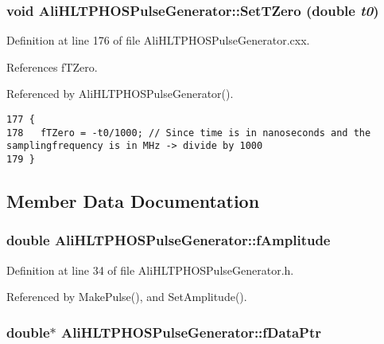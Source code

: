\subsubsection{\setlength{\rightskip}{0pt plus 5cm}void Ali\-HLTPHOSPulse\-Generator::Set\-TZero (double {\em t0})}\label{classAliHLTPHOSPulseGenerator_AliHLTPHOSPulseGeneratora14}




Definition at line 176 of file Ali\-HLTPHOSPulse\-Generator.cxx.

References f\-TZero.

Referenced by Ali\-HLTPHOSPulse\-Generator().

\footnotesize\begin{verbatim}177 {
178   fTZero = -t0/1000; // Since time is in nanoseconds and the samplingfrequency is in MHz -> divide by 1000
179 }
\end{verbatim}\normalsize 




\subsection{Member Data Documentation}
\subsubsection{\setlength{\rightskip}{0pt plus 5cm}double {\bf Ali\-HLTPHOSPulse\-Generator::f\-Amplitude}\hspace{0.3cm}{\tt  [private]}}\label{classAliHLTPHOSPulseGenerator_AliHLTPHOSPulseGeneratorr0}




Definition at line 34 of file Ali\-HLTPHOSPulse\-Generator.h.

Referenced by Make\-Pulse(), and Set\-Amplitude().
\subsubsection{\setlength{\rightskip}{0pt plus 5cm}double$\ast$ {\bf Ali\-HLTPHOSPulse\-Generator::f\-Data\-Ptr}\hspace{0.3cm}{\tt  [private]}}\label{classAliHLTPHOSPulseGenerator_AliHLTPHOSPulseGeneratorr5}




